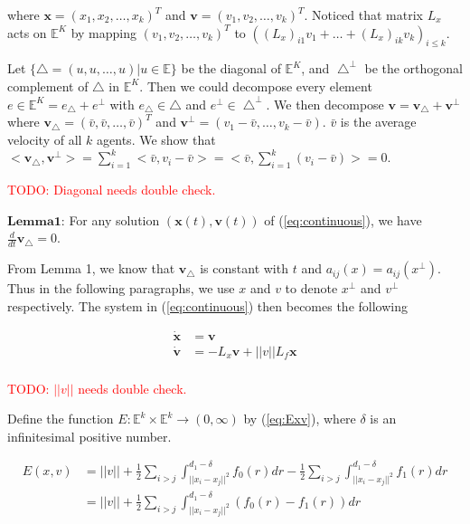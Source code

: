 \noindent
where $\mathbf{x}=(x_1, x_2, \dots, x_k)^T$ and $\mathbf{v}=(v_1, v_2, \dots, v_k)^T$. Noticed that matrix $L_x$ acts on $\mathbb{E}^K$ by mapping $(v_1, v_2, \dots, v_k)^T$ to $((L_x)_{i1}v_1+\dots+(L_x)_{ik}v_k)_{i\leq k}$.

Let $\{\bigtriangleup={(u, u, \dots, u)|u\in\mathbb{E}}\}$ be the diagonal of $\mathbb{E}^K$, and $\bigtriangleup^{\perp}$ be the orthogonal complement of $\bigtriangleup$ in $\mathbb{E}^K$. Then we could decompose every element $e\in\mathbb{E}^K=e_{\bigtriangleup}+e^{\perp}$ with $e_{\bigtriangleup}\in\bigtriangleup$ and $e^{\perp}\in\bigtriangleup^{\perp}$. We then decompose $\mathbf{v}=\mathbf{v_{\bigtriangleup}+v^{\perp}}$ where $\mathbf{v_{\bigtriangleup}}=(\bar{v}, \bar{v}, \dots, \bar{v})^T$ and $\mathbf{v^{\perp}}=(v_1-\bar{v}, \dots, v_k-\bar{v})$. $\bar{v}$ is the average velocity of all $k$ agents. We show that $<\mathbf{v_{\bigtriangleup}}, \mathbf{v^{\perp}}>=\sum_{i=1}^k<\bar{v},v_i-\bar{v}>=<\bar{v},\sum_{i=1}^k(v_i-\bar{v})>=0$.

\textcolor{red}{TODO: Diagonal needs double check.}

$\mathbf{Lemma 1}$: For any solution $(\mathbf{x}(t), \mathbf{v}(t))$ of (\ref{eq:continuous}), we have $\frac{d}{dt}\mathbf{v}_{\bigtriangleup}=0$.

From Lemma 1, we know that $\mathbf{v_{\bigtriangleup}}$ is constant with $t$ and $a_{ij}(x)=a_{ij}(x^{\perp})$. Thus in the following paragraphs, we use $x$ and $v$ to denote $x^{\perp}$ and $v^{\perp}$ respectively. The system in (\ref{eq:continuous}) then becomes the following

\begin{equation}\label{eq:continuous_projection}
\begin{aligned}
\mathbf{\dot{x}}&=\mathbf{v}\\
\mathbf{\dot{v}}&=-L_x\mathbf{v}+||v||L_f\mathbf{x}\\
\end{aligned}
\end{equation}

\textcolor{red}{TODO: $||v||$ needs double check.}

Define the function $E: \mathbb{E}^k\times\mathbb{E}^k\to(0,\infty)$ by (\ref{eq:Exv}), where $\delta$ is an infinitesimal positive number.

\begin{equation}\label{eq:Exv}
\begin{aligned}
E(x, v)&=||v||+\frac{1}{2}\sum_{i>j}\int_{||x_i-x_j||^2}^{d_1-\delta}f_0(r)dr-\frac{1}{2}\sum_{i>j}\int_{||x_i-x_j||^2}^{d_1-\delta}f_1(r)dr\\
&=||v||+\frac{1}{2}\sum_{i>j}\int_{||x_i-x_j||^2}^{d_1-\delta}(f_0(r)-f_1(r))dr
\end{aligned}
\end{equation}

